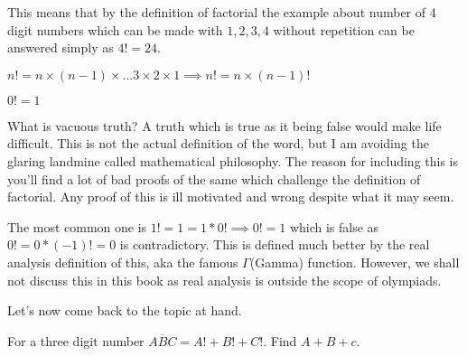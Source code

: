 This means that by the definition of factorial the example about number of $4$ digit numbers which can be made with $1,2,3,4$ without repetition can be answered simply as $4!=24$.\par
\begin{theorem}
    $n!=n\times (n-1)\times \dots 3\times 2 \times 1 \implies n!=n \times (n-1)!$
\end{theorem}
\begin{theorem}
    $0!=1$
\end{theorem}
What is vacuous truth? A truth which is true as it being false would make life difficult. 
This is not the actual definition of the word, but I am avoiding the glaring landmine called 
mathematical philosophy. The reason for including this is you'll find a lot of bad proofs of 
the same which challenge the definition of factorial. Any proof of this is ill motivated and 
wrong despite what it may seem.\par
The most common one is $1!=1=1*0! \implies 0!=1$ which is false as $0!=0*(-1)!=0$ is contradictory. 
This is defined much better by the real analysis definition of this, aka the famous $\Gamma$(Gamma) function. 
However, we shall not discuss this in this book as real analysis is outside the scope of
olympiads.\par
Let's now come back to the topic at hand.
\begin{example}
For a three digit number $\overline{ABC} = A!+B!+C!$. Find $A+B+c$.
\end{example}
